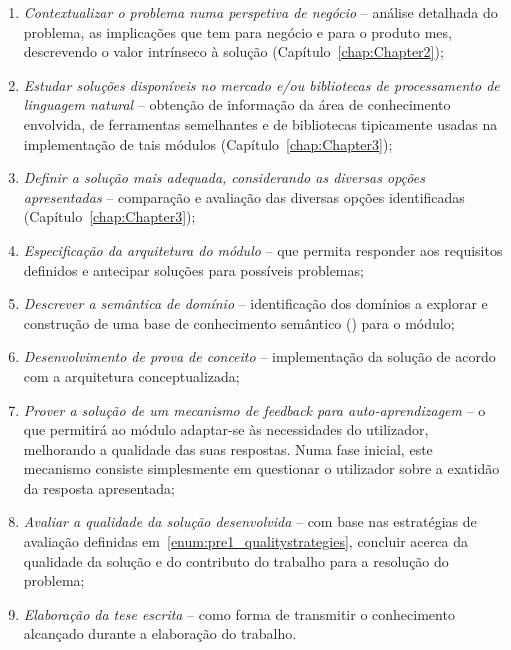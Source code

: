 \begin{enumerate}
    \item
    \label{enum:pre1_objectives_1}
    {
        \textit{Contextualizar o problema numa perspetiva de negócio} -- análise detalhada do problema, as implicações que tem para negócio e para o produto \gls{mes}, descrevendo o valor intrínseco à solução (Capítulo~\ref{chap:Chapter2});
    }
    \item
    \label{enum:pre1_objectives_2}
    {
        \textit{Estudar soluções disponíveis no mercado e/ou bibliotecas de processamento de linguagem natural} -- obtenção de informação da área de conhecimento envolvida, de ferramentas semelhantes e de bibliotecas tipicamente usadas na implementação de tais módulos (Capítulo~\ref{chap:Chapter3});
    }
    \item
    \label{enum:pre1_objectives_3}
    {
        \textit{Definir a solução mais adequada, considerando as diversas opções apresentadas} -- comparação e avaliação das diversas opções identificadas (Capítulo~\ref{chap:Chapter3});
    }
    \item
    \label{enum:pre1_objectives_4}
    {
        \textit{Especificação da arquitetura do módulo} -- que permita responder aos requisitos definidos e antecipar soluções para possíveis problemas;
    }
    \item
    \label{enum:pre1_objectives_5}
    {
        \textit{Descrever a semântica de domínio} -- identificação dos domínios a explorar e construção de uma base de conhecimento semântico () para o módulo;
    }
    \item
    \label{enum:pre1_objectives_6}
    {
        \textit{Desenvolvimento de prova de conceito} -- implementação da solução de acordo com a arquitetura conceptualizada;
    }
    \item
    \label{enum:pre1_objectives_7}
    {
        \textit{Prover a solução de um mecanismo de feedback para auto-aprendizagem} -- o que permitirá ao módulo adaptar-se às necessidades do utilizador, melhorando a qualidade das suas respostas. Numa fase inicial, este mecanismo consiste simplesmente em questionar o utilizador sobre a exatidão da resposta apresentada;
    }
    
    \item
    \label{enum:pre1_objectives_8}
    {
        \textit{Avaliar a qualidade da solução desenvolvida} -- com base nas estratégias de avaliação definidas em~\ref{enum:pre1_qualitystrategies}, concluir acerca da qualidade da solução e do contributo do trabalho para a resolução do problema;
    }
    \item
    \label{enum:pre1_objectives_9}
    {
        \textit{Elaboração da tese escrita} -- como forma de transmitir o conhecimento alcançado durante a elaboração do trabalho.
    }
\end{enumerate}

